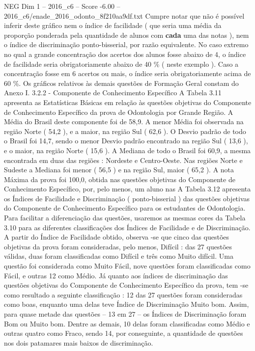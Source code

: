 \begin{textsample}{NEG Dim 1 – 2016\_c6 – Score -6.00 – 2016\_c6/enade\_2016\_odonto\_8f210aa9df.txt}
Cumpre notar que não é possível inferir deste gráfico nem o índice de facilidade ( que seria uma média da proporção ponderada pela quantidade de alunos com \textbf{cada} uma das notas ), nem o índice de discriminação ponto-bisserial, por razão equivalente.
No caso extremo no qual a grande concentração dos acertos dos alunos fosse abaixo de 4, o índice de facilidade seria obrigatoriamente abaixo de 40 \% ( neste exemplo ).
Caso a concentração fosse em 6 acertos ou mais, o índice seria obrigatoriamente acima de 60 \%.
Os gráficos relativos às demais questões de Formação Geral constam do Anexo I. 3.2.2 - Componente de Conhecimento Específico A Tabela 3.11 apresenta as Estatísticas Básicas em relação às questões objetivas do Componente de Conhecimento Específico da prova de Odontologia por Grande Região.
A Média do Brasil deste componente foi de 58,9.
A menor Média foi observada na região Norte ( 54,2 ), e a maior, na região Sul ( 62,6 ).
O Desvio padrão de todo o Brasil foi 14,7, sendo o menor Desvio padrão encontrado na região Sul ( 13,6 ), e o maior, na região Norte ( 15,6 ).
A Mediana de todo o Brasil foi 60,9, a mesma encontrada em duas das regiões : Nordeste e Centro-Oeste.
Nas regiões Norte e Sudeste a Mediana foi menor ( 56,5 ) e na região Sul, maior ( 65,2 ).
A nota Máxima da prova foi 100,0, obtida nas questões objetivas do Componente de Conhecimento Específico, por, pelo menos, um aluno nas A Tabela 3.12 apresenta os Índices de Facilidade e Discriminação ( ponto-bisserial ) das questões objetivas do Componente de Conhecimento Específico para os estudantes de Odontologia.
Para facilitar a diferenciação das questões, usaremos as mesmas cores da Tabela 3.10 para as diferentes classificações dos Índices de Facilidade e de Discriminação.
A partir do Índice de Facilidade obtido, observa -se que cinco das questões objetivas da prova foram consideradas, pelo menos, Difícil : das 27 questões válidas, duas foram classificadas como Difícil e três como Muito difícil.
Uma questão foi considerada como Muito Fácil, nove questões foram classificadas como Fácil, e outras 12 como Médio.
Já quanto aos índices de discriminação das questões objetivas do Componente de Conhecimento Específico da prova, tem -se como resultado a seguinte classificação : 12 das 27 questões foram consideradas como boas, enquanto uma delas teve Índice de Discriminação Muito bom.
Assim, para quase metade das questões – 13 em 27 – os Índices de Discriminação foram Bom ou Muito bom.
Dentre as demais, 10 delas foram classificadas como Médio e outras quatro como Fraco, sendo 14, por conseguinte, a quantidade de questões nos dois patamares mais baixos de discriminação.

\end{textsample}
